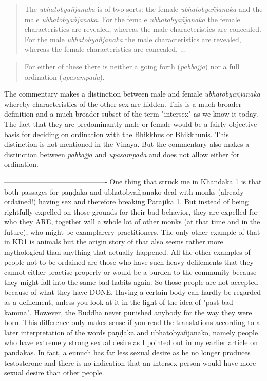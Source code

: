 \medskip

\begin{quote}
The {\em ubhatob­yañ­janaka} is of two sorts: the female {\em ubhatob­yañ­janaka} and the male {\em ubhatob­yañ­janaka}. For the female {\em ubhatob­yañ­janaka} the female characteristics are revealed, whereas the male characteristics are concealed. For the male {\em ubhatob­yañ­janaka} the male characteristics are revealed, whereas the female characteristics are concealed. ... 
\end{quote}
\begin{quote}
For either of these there is neither a going forth ({\em pabbajjā}) nor a full ordination ({\em upasampadā}).
\end{quote}

The commentary makes a distinction between male and female {\em ubhatob­yañ­janaka} whereby characteristics of the other sex are hidden. This is a much broader definition and a much broader subset of the term "intersex" as we know it today. The fact that they are predominantly male or female would be a fairly objective basis for deciding on ordination with the Bhikkhus or Bhikkhunis. This distinction is not mentioned in the Vinaya. But the commentary also makes a distinction between {\em pabbajjā} and {\em upasampadā} and does not allow either for ordination.





-------------------------------------------
One thing that struck me in Khandaka 1 is that both passages for paṇḍaka and ubhatobyañjanako deal with monks (already ordained!) having sex and therefore breaking Parajika 1. But instead of being rightfully expelled on those grounds for their bad behavior, they are expelled for who they ARE, together will a whole lot of other monks (at that time and in the future), who might be examplarery practitioners. The only other example of that in KD1 is animals but the origin story of that also seems rather more mythological than anything that actually happened. All the other examples of people not to be ordained are those who have such heavy defilements that they cannot either practise properly or would be a burden to the community because they might fall into the same bad habits again. So those people are not accepted because of what they have DONE. Having a certain body can hardly be regarded as a defilement, unless you look at it in the light of the idea of "past bad kamma". However, the Buddha never punished anybody for the way they were born.
This difference only makes sense if you read the translations according to a later interpretation of the words paṇḍaka and ubhatobyañjanako, namely people who have extremely strong sexual desire as I pointed out in my earlier article on pandakas. In fact, a eunuch has far less sexual desire as he no longer produces testosterone and there is no indication that an intersex person would have more sexual desire than other people. 



